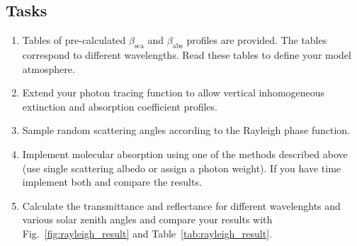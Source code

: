 \documentclass[12pt,twoside,a4paper]{article}
\begin{document}
\subsection{Tasks}
\begin{enumerate}
\item Tables of pre-calculated $\beta_\mathrm{sca}$ and
  $\beta_\mathrm{abs}$ profiles are provided. The tables correspond to
  different wavelengths. Read these tables to define your
  model atmosphere.
\item Extend your photon tracing function to allow vertical
  inhomogeneous extinction and absorption coefficient profiles.
\item Sample random scattering angles according to the Rayleigh phase
  function.  
\item Implement molecular absorption using one of the methods
  described above (use single scattering albedo or assign a photon weight).
  If you have time implement both and compare the results.
\item Calculate the transmittance and reflectance for different 
  wavelenghts and various solar
  zenith angles and compare your results with
  Fig.~\ref{fig:rayleigh_result}
  and Table~\ref{tab:rayleigh_result}.  
\end{enumerate}
\end{document}
